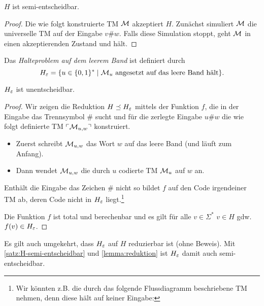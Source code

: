 \begin{Satz}[name={[$H$ ist semi-entscheidbar]}]\label{satz:H-semi-entscheidbar}
	$H$ ist semi-entscheidbar.
\end{Satz}
\begin{proof}
	Die wie folgt konstruierte \ac{TM} $\mathcal{M}$ akzeptiert $H$.
	Zunächst simuliert $\mathcal{M}$ die universelle \ac{TM} auf der Eingabe $v\#w$.
	Falls diese Simulation stoppt, geht $\mathcal{M}$ in einen akzeptierenden Zustand und hält.
\end{proof}


\begin{Def}[name={[Halteproblem auf leerem Band $H_\Eps$]}]
	Das \emph{Halteproblem auf dem leerem Band} ist definiert durch
	\[H_\varepsilon = \{u\in\{0,1\}^* \mid \mathcal{M}_u \text{ angesetzt auf das leere Band hält}\}. \qedhere\]
\end{Def}


\begin{Satz}[name={[$H_\Eps$ ist unentscheidbar]}]
	\label{satz:HalteproblemLeeresBand}
	$H_\Eps$ ist unentscheidbar.
\end{Satz}
\begin{proof}
	Wir zeigen die Reduktion $H \preceq H_\varepsilon$ mittels der Funktion $f$, 
	die in der Eingabe das Trennsymbol $\#$ sucht und
	für die zerlegte Eingabe $u\#w$ die wie folgt definierte \ac{TM} $\ulcorner \mathcal{M}_{u,w} \urcorner$ konstruiert.
	\begin{itemize}
		\item Zuerst schreibt $\mathcal{M}_{u,w}$ das Wort $w$ auf das leere Band (und läuft zum Anfang).
		\item Dann wendet $\mathcal{M}_{u,w}$ die durch $u$ codierte \ac{TM} $\mathcal{M}_u$ auf $w$ an.
	\end{itemize}
	Enthält die Eingabe das Zeichen $\#$ nicht so bildet $f$ auf den Code irgendeiner TM ab,
	deren Code nicht in $H_\Eps$ liegt.\footnote{
		Wir könnten z.B. die durch das folgende Flussdiagramm beschriebene TM nehmen, denn diese hält auf keiner Eingabe:
		}
	
	Die Funktion $f$ ist total und berechenbar und es gilt für alle $v\in\Sigma^*$ $v\in H$ gdw.\ $f(v) \in H_\varepsilon$.
\end{proof}


\begin{Bemerkung}
	Es gilt auch umgekehrt, dass $H_\Eps$ auf $H$ reduzierbar ist
	(ohne Beweis).
	Mit \autoref{satz:H-semi-entscheidbar} und \autoref{lemma:reduktion} ist $H_\Eps$ damit auch semi-entscheidbar.
\end{Bemerkung}



